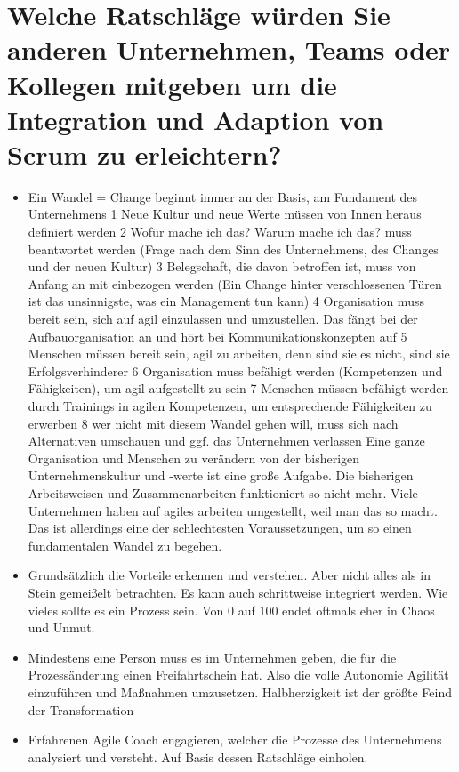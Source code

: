 \section*{Welche Ratschläge würden Sie anderen Unternehmen, Teams oder Kollegen mitgeben um die Integration und Adaption von Scrum zu erleichtern?}
\begin{itemize}
    \item[\openresponse] Ein Wandel = Change beginnt immer an der Basis, am Fundament des Unternehmens 1 Neue Kultur und neue Werte müssen von Innen heraus definiert werden 2 Wofür mache ich das? Warum mache ich das? muss beantwortet werden (Frage nach dem Sinn des Unternehmens, des Changes und der neuen Kultur) 3 Belegschaft, die davon betroffen ist, muss von Anfang an mit einbezogen werden (Ein Change hinter verschlossenen Türen ist das unsinnigste, was ein Management tun kann) 4 Organisation muss bereit sein, sich auf agil einzulassen und umzustellen. Das fängt bei der Aufbauorganisation an und hört bei Kommunikationskonzepten auf 5 Menschen müssen bereit sein, agil zu arbeiten, denn sind sie es nicht, sind sie Erfolgsverhinderer 6 Organisation muss befähigt werden (Kompetenzen und Fähigkeiten), um agil aufgestellt zu sein 7 Menschen müssen befähigt werden durch Trainings in agilen Kompetenzen, um entsprechende Fähigkeiten zu erwerben 8 wer nicht mit diesem Wandel gehen will, muss sich nach Alternativen umschauen und ggf. das Unternehmen verlassen Eine ganze Organisation und Menschen zu verändern von der bisherigen Unternehmenskultur und -werte ist eine große Aufgabe. Die bisherigen Arbeitsweisen und Zusammenarbeiten funktioniert so nicht mehr. Viele Unternehmen haben auf agiles arbeiten umgestellt, weil man das so macht. Das ist allerdings eine der schlechtesten Voraussetzungen, um so einen fundamentalen Wandel zu begehen.
    \item[\openresponse] Grundsätzlich die Vorteile erkennen und verstehen. Aber nicht alles als in Stein gemeißelt betrachten. Es kann auch schrittweise integriert werden. Wie vieles sollte es ein Prozess sein. Von 0 auf 100 endet oftmals eher in Chaos und Unmut.
    \item[\openresponse] Mindestens eine Person muss es im Unternehmen geben, die für die Prozessänderung einen Freifahrtschein hat. Also die volle Autonomie Agilität einzuführen und Maßnahmen umzusetzen. Halbherzigkeit ist der größte Feind der Transformation
    \item[\openresponse] Erfahrenen Agile Coach engagieren, welcher die Prozesse des Unternehmens analysiert und versteht. Auf Basis dessen Ratschläge einholen.

\end{itemize}
